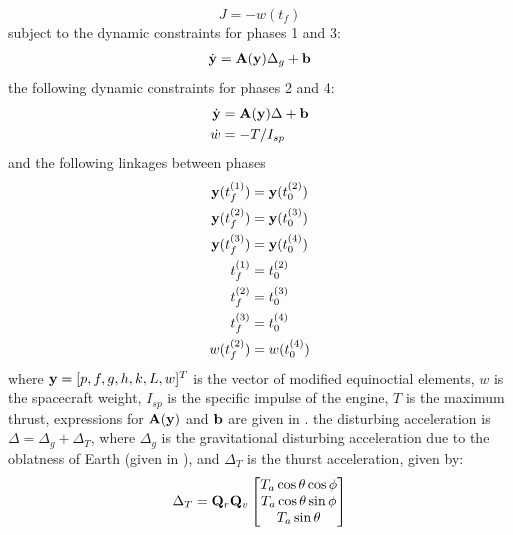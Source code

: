 \documentclass[a4paper,11pt]{report}    %
\newcommand{\mt}[1]{\ensuremath \mathbf{#1}}
\begin{document}
\begin{equation}
   J = -w(t_f)
\end{equation}
subject to the dynamic constraints for phases 1 and 3:
\begin{equation}
\begin{aligned}
 \dot {\mt{y}} &= \mt{A}(\mt{y}) \Delta_g + \mt{b}\\
\end{aligned}
\end{equation}
the following dynamic constraints for phases 2 and 4:
\begin{equation}
\begin{aligned}
 \dot {\mt{y}} &= \mt{A}(\mt{y}) \Delta + \mt{b}\\
  \dot w  &= -T / I_{sp}
\end{aligned}
\end{equation}
and the following linkages between phases
\begin{equation}
\begin{aligned}
    \mt{y}(t_f^{(1)}) &= \mt{y}(t_0^{(2)}) \\
    \mt{y}(t_f^{(2)}) &= \mt{y}(t_0^{(3)}) \\
    \mt{y}(t_f^{(3)}) &= \mt{y}(t_0^{(4)}) \\
    t_f^{(1)} &= t_0^{(2)} \\
    t_f^{(2)} &= t_0^{(3)} \\
    t_f^{(3)} &= t_0^{(4)} \\
    w(t_f ^{(2)} ) &= w( t_0^{(4)} ) \\
\end{aligned}
\end{equation}
where $\mt{y} = [p, f, g, h, k, L, w]^T$ is the vector of modified equinoctial elements, $w$ is the spacecraft weight, $I_{sp}$ is the specific impulse of the engine, $T$ is the maximum thrust, 
expressions for $\mt{A}(\mt{y})$ and $\mt{b}$ are given in \cite{Betts:01}. the disturbing acceleration is $\Delta = \Delta_g + \Delta_T$, where $\Delta_g$ is the gravitational disturbing
acceleration due to the oblatness of Earth (given in \cite{Betts:01}), and $\Delta_T$ is the thurst acceleration, given by:
\begin{equation}
  \Delta_T = \mt{Q}_r \mt{Q}_v \begin{bmatrix} T_a \cos \theta \cos \phi \\ T_a \cos \theta \sin \phi \\ T_a \sin \theta \end{bmatrix}
\end{equation}
\end{document}
